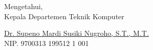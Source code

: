   \vspace{2ex}

  \begin{center}
    Mengetahui, \\
    Kepala Departemen Teknik Komputer \\

    \vspace{8ex}

    \underline{Dr. Supeno Mardi Susiki Nugroho, S.T., M.T.} \\
    NIP. 9700313 199512 1 001
  \end{center}
\endgroup
